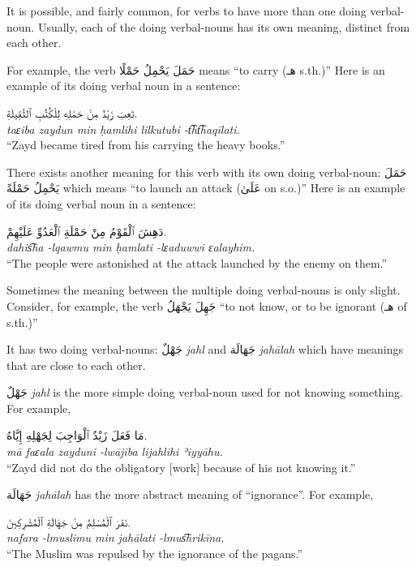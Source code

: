 \documentclass[
  10pt,
]{book}
\begin{document}
It is possible, and fairly common, for verbs to have more than one doing verbal-noun. Usually, each of the doing verbal-nouns has its own meaning, distinct from each other.

For example, the verb \foreignlanguage{arabic}{حَمَلَ يَحْمِلُ حَمْلًا} means \enquote{to carry (\foreignlanguage{arabic}{هـ} s.th.)} Here is an example of its doing verbal noun in a sentence:

\foreignlanguage{arabic}{تَعِبَ زَيْدٌ مِنْ حَمْلِهِ لِلْکُتُبِ ٱلثَّقِيلَةِ.}\\
\emph{taɛiba zaydun min ḥamlihi lilkutubi -t͡ht͡haqīlati.}\\
\enquote{Zayd became tired from his carrying the heavy books.}

There exists another meaning for this verb with its own doing verbal-noun: \foreignlanguage{arabic}{حَمَلَ يَحْمِلُ حَمْلَةً} which means \enquote{to launch an attack (\foreignlanguage{arabic}{عَلَىٰ} on s.o.)} Here is an example of its doing verbal noun in a sentence:

\foreignlanguage{arabic}{دَهِشَ ٱلْقَوْمُ مِنْ حَمْلَةِ ٱلْعَدُوِّ عَلَيْهِمْ.}\\
\emph{dahis͡ha -lqawmu min ḥamlati -lɛaduwwi ɛalayhim.}\\
\enquote{The people were astonished at the attack launched by the enemy on them.}

Sometimes the meaning between the multiple doing verbal-nouns is only slight. Consider, for example, the verb \foreignlanguage{arabic}{جَهِلَ يَجْهَلُ} \enquote{to not know, or to be ignorant (\foreignlanguage{arabic}{هـ} of s.th.)}

It has two doing verbal-nouns: \foreignlanguage{arabic}{جَهْلٌ} \emph{jahl} and \foreignlanguage{arabic}{جَهَالَة} \emph{jahālah} which have meanings that are close to each other.

\foreignlanguage{arabic}{جَهْلٌ} \emph{jahl} is the more simple doing verbal-noun used for not knowing something. For example,

\foreignlanguage{arabic}{مَا فَعَلَ زَيْدٌ ٱلْوَاجِبَ لِجَهْلِهِ إِيَّاهُ.}\\
\emph{mā faɛala zayduni -lwājiba lijahlihi ʾiyyāhu.}\\
\enquote{Zayd did not do the obligatory {[}work{]} because of his not knowing it.}

\foreignlanguage{arabic}{جَهَالَة} \emph{jahālah} has the more abstract meaning of \enquote{ignorance}. For example,

\foreignlanguage{arabic}{نَفَرَ ٱلْمُسْلِمُ مِنْ جَهَالَةِ ٱلْمُشْرِکِينَ.}\\
\emph{nafara -lmuslimu min jahālati -lmus͡hrikīna.}\\
\enquote{The Muslim was repulsed by the ignorance of the pagans.}
\end{document}
